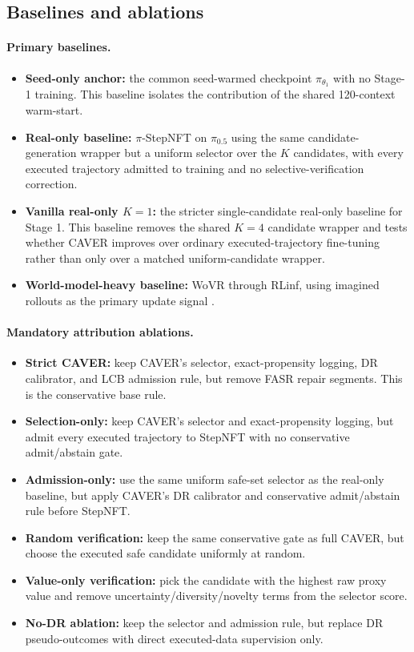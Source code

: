 \documentclass[10pt]{article}
\theoremstyle{plain}
\theoremstyle{definition}
\theoremstyle{remark}
\begin{document}
\subsection{Baselines and ablations}
\paragraph{Primary baselines.}
\begin{itemize}
    \item \textbf{Seed-only anchor:} the common seed-warmed checkpoint $\pi_{\theta_1}$ with no Stage-1 training. This baseline isolates the contribution of the shared 120-context warm-start.
    \item \textbf{Real-only baseline:} $\pi$-StepNFT on $\pi_{0.5}$ using the same candidate-generation wrapper but a uniform selector over the $K$ candidates, with every executed trajectory admitted to training and no selective-verification correction.
    \item \textbf{Vanilla real-only $K=1$:} the stricter single-candidate real-only baseline for Stage 1. This baseline removes the shared $K=4$ candidate wrapper and tests whether CAVER improves over ordinary executed-trajectory fine-tuning rather than only over a matched uniform-candidate wrapper.
    \item \textbf{World-model-heavy baseline:} WoVR through RLinf, using imagined rollouts as the primary update signal \citep{jiang2026wovr,rlinfrepo2026}.
\end{itemize}

\paragraph{Mandatory attribution ablations.}
\begin{itemize}
    \item \textbf{Strict CAVER:} keep CAVER's selector, exact-propensity logging, DR calibrator, and LCB admission rule, but remove FASR repair segments. This is the conservative base rule.
    \item \textbf{Selection-only:} keep CAVER's selector and exact-propensity logging, but admit every executed trajectory to StepNFT with no conservative admit/abstain gate.
    \item \textbf{Admission-only:} use the same uniform safe-set selector as the real-only baseline, but apply CAVER's DR calibrator and conservative admit/abstain rule before StepNFT.
    \item \textbf{Random verification:} keep the same conservative gate as full CAVER, but choose the executed safe candidate uniformly at random.
    \item \textbf{Value-only verification:} pick the candidate with the highest raw proxy value and remove uncertainty/diversity/novelty terms from the selector score.
    \item \textbf{No-DR ablation:} keep the selector and admission rule, but replace DR pseudo-outcomes with direct executed-data supervision only.
\end{itemize}
\end{document}

